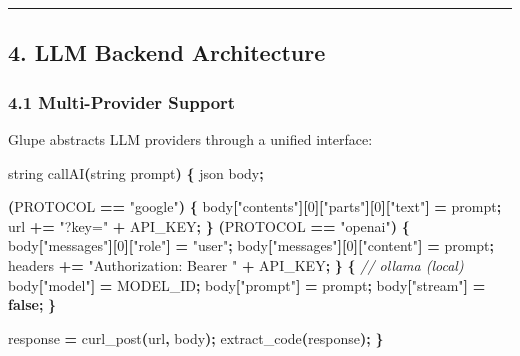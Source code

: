 \documentclass[11pt, a4paper]{article}
\newenvironment{Shaded}{\begin{snugshade}}{\end{snugshade}}
\newcommand{\CommentTok}[1]{\textcolor[rgb]{0.56,0.35,0.01}{\textit{#1}}}
\newcommand{\DecValTok}[1]{\textcolor[rgb]{0.00,0.00,0.81}{#1}}
\newcommand{\KeywordTok}[1]{\textcolor[rgb]{0.13,0.29,0.53}{\textbf{#1}}}
\newcommand{\NormalTok}[1]{#1}
\newcommand{\OperatorTok}[1]{\textcolor[rgb]{0.81,0.36,0.00}{\textbf{#1}}}
\newcommand{\StringTok}[1]{\textcolor[rgb]{0.31,0.60,0.02}{#1}}
\begin{document}
\begin{center}\rule{0.5\linewidth}{0.5pt}\end{center}

\subsection{4. LLM Backend Architecture}\label{llm-backend-architecture}

\subsubsection{4.1 Multi-Provider Support}\label{multi-provider-support}

Glupe abstracts LLM providers through a unified interface:

\begin{Shaded}
\begin{Highlighting}[]
\NormalTok{string callAI}\OperatorTok{(}\NormalTok{string prompt}\OperatorTok{)} \OperatorTok{\{}
\NormalTok{    json body}\OperatorTok{;}
    
     \OperatorTok{(}\NormalTok{PROTOCOL }\OperatorTok{==} \StringTok{"google"}\OperatorTok{)} \OperatorTok{\{}
\NormalTok{        body}\OperatorTok{[}\StringTok{"contents"}\OperatorTok{][}\DecValTok{0}\OperatorTok{][}\StringTok{"parts"}\OperatorTok{][}\DecValTok{0}\OperatorTok{][}\StringTok{"text"}\OperatorTok{]} \OperatorTok{=}\NormalTok{ prompt}\OperatorTok{;}
\NormalTok{        url }\OperatorTok{+=} \StringTok{"?key="} \OperatorTok{+}\NormalTok{ API\_KEY}\OperatorTok{;}
    \OperatorTok{\}} 
      \OperatorTok{(}\NormalTok{PROTOCOL }\OperatorTok{==} \StringTok{"openai"}\OperatorTok{)} \OperatorTok{\{}
\NormalTok{        body}\OperatorTok{[}\StringTok{"messages"}\OperatorTok{][}\DecValTok{0}\OperatorTok{][}\StringTok{"role"}\OperatorTok{]} \OperatorTok{=} \StringTok{"user"}\OperatorTok{;}
\NormalTok{        body}\OperatorTok{[}\StringTok{"messages"}\OperatorTok{][}\DecValTok{0}\OperatorTok{][}\StringTok{"content"}\OperatorTok{]} \OperatorTok{=}\NormalTok{ prompt}\OperatorTok{;}
\NormalTok{        headers }\OperatorTok{+=} \StringTok{"Authorization: Bearer "} \OperatorTok{+}\NormalTok{ API\_KEY}\OperatorTok{;}
    \OperatorTok{\}}
     \OperatorTok{\{} \CommentTok{// ollama (local)}
\NormalTok{        body}\OperatorTok{[}\StringTok{"model"}\OperatorTok{]} \OperatorTok{=}\NormalTok{ MODEL\_ID}\OperatorTok{;}
\NormalTok{        body}\OperatorTok{[}\StringTok{"prompt"}\OperatorTok{]} \OperatorTok{=}\NormalTok{ prompt}\OperatorTok{;}
\NormalTok{        body}\OperatorTok{[}\StringTok{"stream"}\OperatorTok{]} \OperatorTok{=} \KeywordTok{false}\OperatorTok{;}
    \OperatorTok{\}}
    
\NormalTok{    response }\OperatorTok{=}\NormalTok{ curl\_post}\OperatorTok{(}\NormalTok{url}\OperatorTok{,}\NormalTok{ body}\OperatorTok{);}
    \NormalTok{ extract\_code}\OperatorTok{(}\NormalTok{response}\OperatorTok{);}
\OperatorTok{\}}
\end{Highlighting}
\end{Shaded}
\end{document}
